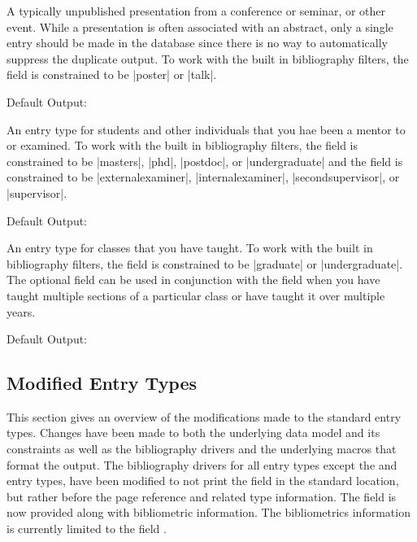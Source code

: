 \documentclass{ltxdockit}[2011/03/25]
\newcommand{\exampitem}[1]{\begingroup%
  \par\itemsep0.5\itemsep\item%
  Default Output: \par%
  \printbibliography[env = unnumbered, resetnumbers = true, check = #1]%
\endgroup}
\begin{document}
\begin{typelist}
		A typically unpublished presentation from a conference or seminar, or other event. While a presentation is often associated with an abstract, only a single entry should be made in the database since there is no way to automatically suppress the duplicate output. To work with the built in bibliography filters, the field  is constrained to be |poster| or |talk|.
	\exampitem{Presentation}

		An entry type for students and other individuals that you hae been a mentor to or examined. To work with the built in bibliography filters, the field  is constrained to be |masters|, |phd|, |postdoc|, or |undergraduate| and the field  is constrained to be |externalexaminer|, |internalexaminer|, |secondsupervisor|, or |supervisor|.
	\exampitem{Student}

		An entry type for classes that you have taught. To work with the built in bibliography filters, the field  is constrained to be |graduate| or |undergraduate|. The optional field  can be used in conjunction with the field  when you have taught multiple sections of a particular class or have taught it over multiple years.
	\exampitem{Teaching}

\end{typelist}

\subsection{Modified Entry Types}
This section gives an overview of the modifications made to the standard entry types. Changes have been made to both the underlying data model and its constraints as well as the bibliography drivers and the underlying macros that format the output. The bibliography drivers for all entry types except the  and  entry types, have been modified to not print the field  in the standard location, but rather before the page reference and related type information. The field  is now provided along with bibliometric information. The bibliometrics information is currently limited to the field .
\end{document}
